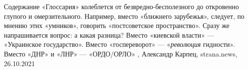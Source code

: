 Содержание «Глоссария» колеблется от безвредно-бесполезного до откровенно
глупого и омерзительного.  Например, вместо «ближнего зарубежья», следует, по
мнению этих «умников», говорить «постсоветское пространство». Сразу же
напрашивается вопрос: а какая разница?  Вместо «киевской власти» — «Украинское
государство».  Вместо «госпереворот» — «\emph{революция} гидности».  Вместо
«ДНР» и «ЛНР» — «ОРДО/ОРЛО»
, 
Александр Карпец, strana.news, 26.10.2021
